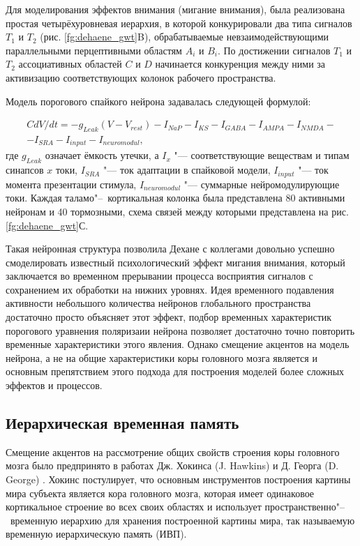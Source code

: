 Для моделирования эффектов внимания (мигание внимания), была реализована простая четырёхуровневая иерархия, в которой конкурировали два типа сигналов $T_1$ и $T_2$ (рис. \ref{fg:dehaene_gwt}B), обрабатываемые невзаимодействующими параллельными перцептивными областям $A_i$ и $B_i$. По достижении сигналов $T_1$ и $T_2$ ассоциативных областей $C$ и $D$ начинается конкуренция между ними за активизацию соответствующих колонок рабочего пространства.

Модель порогового спайкого нейрона задавалась следующей формулой:

\[
	\begin{split}
		CdV/dt=-g_{Leak}(V-V_{rest})-I_{NaP}-I_{KS}-I_{GABA}-I_{AMPA}-I_{NMDA}-\\
		-I_{SRA}-I_{input}-I_{neuromodul},
	\end{split}
\]
где $g_{Leak}$ означает ёмкость утечки, а $I_x$ "--- соответствующие веществам и типам синапсов $x$ токи, $I_{SRA}$ "--- ток адаптации в спайковой модели, $I_{input}$ "--- ток момента презентации стимула, $I_{neuromodul}$ "--- суммарные нейромодулирующие токи. Каждая таламо"--~кортикальная колонка была представлена 80 активными нейронам и 40 тормозными, схема связей между которыми представлена на рис. \ref{fg:dehaene_gwt}С.

Такая нейронная структура позволила Дехане с коллегами довольно успешно смоделировать известный психологический эффект мигания внимания, который заключается во временном прерывании процесса восприятия сигналов с сохранением их обработки на нижних уровнях. Идея временного подавления активности небольшого количества нейронов глобального пространства достаточно просто объясняет этот эффект, подбор временных характеристик порогового уравнения поляризаии нейрона позволяет достаточно точно повторить временные характеристики этого явления. Однако смещение акцентов на модель нейрона, а не на общие характеристики коры головного мозга является и основным препятствием этого подхода для построения моделей более сложных эффектов и процессов.

\subsection{Иерархическая временная память}

Смещение акцентов на рассмотрение общих свойств строения коры головного мозга было предпринято в работах Дж. Хокинса (J. Hawkins) и Д. Георга (D. George) \cite{George2005,Hawkins2009}. Хокинс постулирует, что основным инструментов построения картины мира субъекта является кора головного мозга, которая имеет одинаковое кортикальное строение во всех своих областях и использует пространственно"--~временную иерархию для хранения построенной картины мира, так называемую временную иерархическую память (ИВП).

